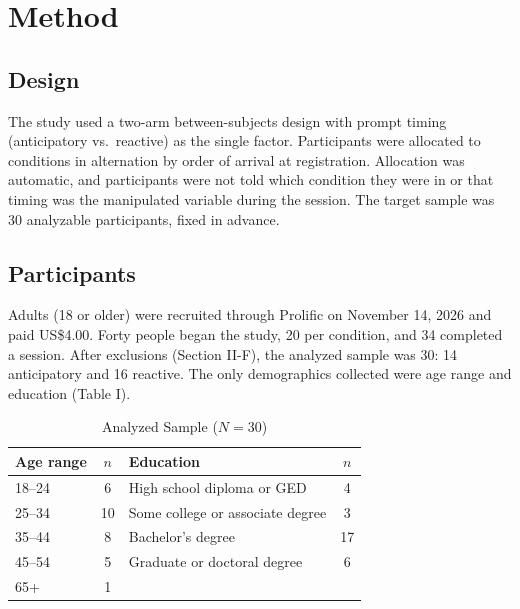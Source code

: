 \documentclass[12pt,letterpaper]{article}
\begin{document}
\section{Method}
\subsection{Design}
The study used a two-arm between-subjects design with prompt timing (anticipatory vs.\ reactive) as the single factor. Participants were allocated to conditions in alternation by order of arrival at registration. Allocation was automatic, and participants were not told which condition they were in or that timing was the manipulated variable during the session. The target sample was 30 analyzable participants, fixed in advance.

\subsection{Participants}
Adults (18 or older) were recruited through Prolific on November 14, 2026 and paid US\$4.00. Forty people began the study, 20 per condition, and 34 completed a session. After exclusions (Section II-F), the analyzed sample was 30: 14 anticipatory and 16 reactive. The only demographics collected were age range and education (Table I).

\begin{table}[ht]\centering\footnotesize
\caption{Analyzed Sample ($N = 30$)}
\begin{tabular}{lc@{\hspace{3em}}lc}
\toprule
Age range & $n$ & Education & $n$\\
\midrule
18--24 & 6 & High school diploma or GED & 4\\
25--34 & 10 & Some college or associate degree & 3\\
35--44 & 8 & Bachelor's degree & 17\\
45--54 & 5 & Graduate or doctoral degree & 6\\
65+ & 1 & & \\
\bottomrule
\end{tabular}
\end{table}
\end{document}
